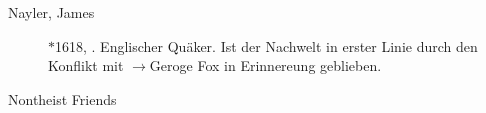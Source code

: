 \begin{description}
 \item[Nayler, James] $\ast$1618, . Englischer Quäker. Ist der Nachwelt in erster Linie durch den Konflikt mit $\to$Geroge Fox in Erinnereung geblieben.


 \item[Nontheist Friends]

 \end{description}

\normalsize
